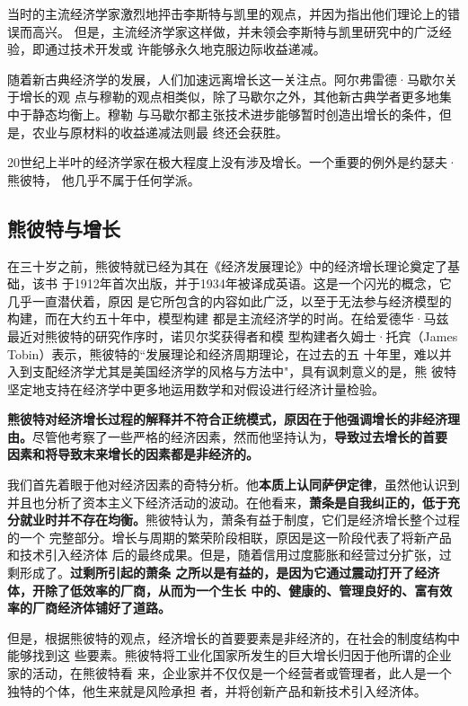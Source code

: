 当时的主流经济学家激烈地抨击李斯特与凯里的观点，并因为指出他们理论上的错误而高兴。
但是，主流经济学家这样做，并未领会李斯特与凯里研究中的广泛经验，即通过技术开发或
许能够永久地克服边际收益递减。

随着新古典经济学的发展，人们加速远离增长这一关注点。阿尔弗雷德·马歇尔关于增长的观
点与穆勒的观点相类似，除了马歇尔之外，其他新古典学者更多地集中于静态均衡上。穆勒
与马歇尔都主张技术进步能够暂时创造出增长的条件，但是，农业与原材料的收益递减法则最
终还会获胜。

20世纪上半叶的经济学家在极大程度上没有涉及增长。一个重要的例外是约瑟夫·熊彼特，
他几乎不属于任何学派。

\subsection{熊彼特与增长}

在三十岁之前，熊彼特就已经为其在《经济发展理论》中的经济增长理论奠定了基础，该书
于1912年首次出版，并于1934年被译成英语。这是一个闪光的概念，它几乎一直潜伏着，原因
是它所包含的内容如此广泛，以至于无法参与经济模型的构建，而在大约五十年中，模型构建
都是主流经济学的时尚。在给爱德华·马兹最近对熊彼特的研究作序时，诺贝尔奖获得者和模
型构建者久姆士·托宾（James Tobin）表示，熊彼特的“发展理论和经济周期理论，在过去的五
十年里，难以并入到支配经济学尤其是美国经济学的风格与方法中"，具有讽刺意义的是，熊
彼特坚定地支持在经济学中更多地运用数学和对假设进行经济计量检验。

\textbf{熊彼特对经济增长过程的解释并不符合正统模式，原因在于他强调增长的非经济理
  由。}尽管他考察了一些严格的经济因素，然而他坚持认为，\textbf{导致过去增长的首要
  因素和将导致末来增长的因素都是非经济的。}

我们首先着眼于他对经济因素的奇特分析。他\textbf{本质上认同萨伊定律}，虽然他认识到
并且也分析了资本主义下经济活动的波动。在他看来，\textbf{萧条是自我纠正的，低于充
  分就业时并不存在均衡。}熊彼特认为，萧条有益于制度，它们是经济增长整个过程的一个
完整部分。增长与周期的繁荣阶段相联，原因是这一阶段代表了将新产品和技术引入经济体
后的最终成果。但是，随着信用过度膨胀和经营过分扩张，过剩形成了。\textbf{过剩所引起的萧条
之所以是有益的，是因为它通过震动打开了经济体，开除了低效率的厂商，从而为一个生长
中的、健康的、管理良好的、富有效率的厂商经济体铺好了道路。}

但是，根据熊彼特的观点，经济增长的首要要素是非经济的，在社会的制度结构中能够找到这
些要素。熊彼特将工业化国家所发生的巨大增长归因于他所谓的企业家的活动，在熊彼特看
来，企业家并不仅仅是一个经营者或管理者，此人是一个独特的个体，他生来就是风险承担
者，并将创新产品和新技术引入经济体。

